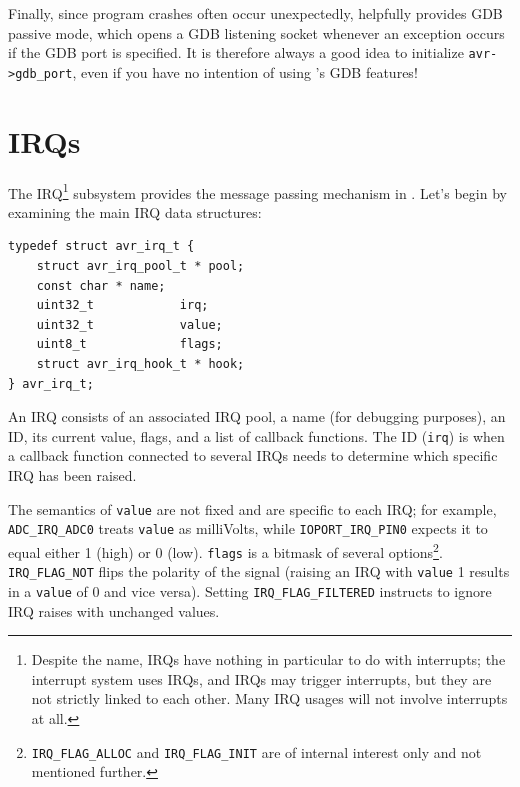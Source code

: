 Finally, since program crashes often occur unexpectedly, \simavr helpfully
provides \ac{GDB} passive mode, which
opens a \ac{GDB} listening socket whenever an exception occurs if the \ac{GDB}
port is specified. It is therefore always a good idea to initialize \lstinline|avr->gdb_port|, even
if you have no intention of using \simavr's \ac{GDB} features!


\section{\acfp{IRQ}}

The \acf{IRQ}\footnote{
%
Despite the name, \acp{IRQ} have nothing in particular to do with interrupts;
the interrupt system uses \acp{IRQ}, and \acp{IRQ} may trigger interrupts, but
they are not strictly linked to each other. Many \ac{IRQ} usages will not involve
interrupts at all.}
%
subsystem provides the message passing mechanism in \simavr. Let's begin
by examining the main \ac{IRQ} data structures:

\begin{lstlisting}
typedef struct avr_irq_t {
    struct avr_irq_pool_t * pool;
    const char * name;
    uint32_t            irq;
    uint32_t            value;
    uint8_t             flags;
    struct avr_irq_hook_t * hook;
} avr_irq_t;
\end{lstlisting}

An \ac{IRQ} consists of an associated \ac{IRQ} pool, a name (for debugging
purposes), an \ac{ID}, its current value, flags, and a list of callback functions.
The \ac{ID} (\lstinline|irq|) is when a callback function connected to several \acp{IRQ}
needs to determine which specific \ac{IRQ} has been raised.

The semantics of \lstinline|value| are not fixed and are specific to each \ac{IRQ};
for example, \lstinline|ADC_IRQ_ADC0| treats \lstinline|value| as milliVolts,
while \lstinline|IOPORT_IRQ_PIN0| expects it to equal either 1 (high) or 0 (low).
\lstinline|flags| is a bitmask of several options\footnote{
%
\lstinline|IRQ_FLAG_ALLOC| and \lstinline|IRQ_FLAG_INIT| are of internal interest
only and not mentioned further.
%
}.
\lstinline|IRQ_FLAG_NOT| flips
the polarity of the signal (raising an \ac{IRQ} with \lstinline|value| 1 results
in a \lstinline|value| of 0 and vice versa).
Setting \lstinline|IRQ_FLAG_FILTERED| instructs \simavr to ignore \ac{IRQ}
raises with unchanged values.

